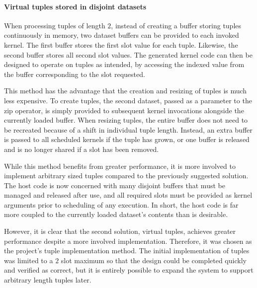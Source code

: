 \paragraph*{Virtual tuples stored in disjoint datasets}
When processing tuples of length $2$, instead of creating a buffer storing tuples continuously in memory, two dataset buffers can be provided to each invoked kernel. The first buffer stores the first slot value for each tuple. Likewise, the second buffer stores all second slot values. The generated kernel code can then be designed to operate on tuples as intended, by accessing the indexed value from the buffer corresponding to the slot requested.

This method has the advantage that the creation and resizing of tuples is much less expensive. To create tuples, the second dataset, passed as a parameter to the zip operator, is simply provided to subsequent kernel invocations alongside the currently loaded buffer. When resizing tuples, the entire buffer does not need to be recreated because of a shift in individual tuple length. Instead, an extra buffer is passed to all scheduled kernels if the tuple has grown, or one buffer is released and is no longer shared if a slot has been removed.

While this method benefits from greater performance, it is more involved to implement arbitrary sized tuples compared to the previously suggested solution. The host code is now concerned with many disjoint buffers that must be managed and released after use, and all required slots must be provided as kernel arguments prior to scheduling of any execution. In short, the host code is far more coupled to the currently loaded dataset's contents than is desirable.

However, it is clear that the second solution, virtual tuples, achieves greater performance despite a more involved implementation. Therefore, it was chosen as the project's tuple implementation method. The initial implementation of tuples was limited to a $2$ slot maximum so that the design could be completed quickly and verified as correct, but it is entirely possible to expand the system to support arbitrary length tuples later.
